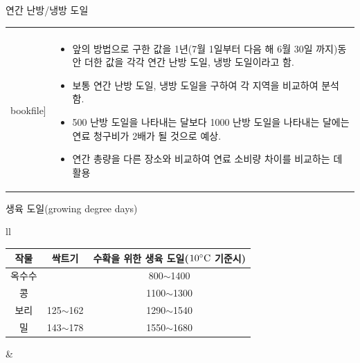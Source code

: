 \begin{frame}[t]{연간 난방/냉방 도일}
	\begin{tabular}{ll}
		\begin{minipage}[t]{0.450\textwidth}
			\begin{figure}[t]
				\texttt{[image: \\bookfile]}
			\end{figure}
		\end{minipage}	
		&
		\begin{minipage}[t]{0.5\textwidth}
			\begin{itemize} \scriptsize 
				\item 앞의 방법으로 구한 값을 1년(7월 1일부터 다음 해 6월 30일 까지)동안 더한 값을 각각 연간 난방 도일, 냉방 도일이라고 함.
				\item 보통 연간 난방 도일, 냉방 도일을 구하여 각 지역을 비교하여 분석함.
				\item 500 난방 도일을 나타내는 달보다 1000 난방 도일을 나타내는 달에는 연료 청구비가 2배가 될 것으로 예상.
				\item 연간 총량을 다른 장소와 비교하여 연료 소비량 차이를 비교하는 데 활용
			\end{itemize}	
		\end{minipage}	
	\end{tabular}	
\end{frame}





\begin{frame}[t]{생육 도일(growing degree days)}
	\begin{tabular}{ll}
		\begin{minipage}[t]{0.550\textwidth} 
			{\scriptsize 
			\begin{table}[]
					\begin{tabular}{c|c|c}
						\hline
						작물  & 싹트기          & 수확을 위한 생육 도일($10 \rm{{^\circ}C}$ 기준시) \\\hline
						옥수수 &              & 800$\sim$1400         \\	\hline
						콩   &              & 1100$\sim$1300        \\	\hline
						보리  & 125$\sim$162 & 1290$\sim$1540        \\	\hline
						밀   & 143$\sim$178 & 1550$\sim$1680       \\	\hline
					\end{tabular}%
			\end{table}
		}
		\end{minipage}	
		&
		\begin{minipage}[t]{0.4\textwidth}
		\end{minipage}	
	\end{tabular}	
\end{frame}







